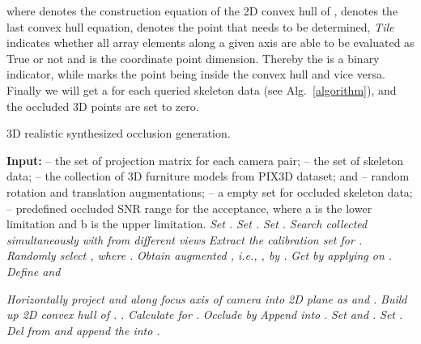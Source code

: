 \documentclass[lettersize,journal]{IEEEtran}
\begin{document}
where  denotes the construction equation of the 2D convex hull of ,  denotes the last convex hull equation,  denotes the point that needs to be determined, \textit{Tile} indicates whether all array elements along a given axis are able to be evaluated as True or not and  is the coordinate point dimension.
Thereby the  is a binary indicator, while  marks the point being inside the convex hull and vice versa. Finally we will get a  for each queried skeleton data (see Alg.~\ref{algorithm}), and the occluded 3D points are set to zero.
\begin{algorithm}[t]
    \caption{3D realistic synthesized occlusion generation.}
    \label{algorithm}
    \renewcommand{\thealgorithm}{}
    \begin{algorithmic}[1]
        \small{
            \STATEx \textbf{Input:}  -- the set of projection matrix for each camera pair;  -- the set of skeleton data;  -- the collection of 3D furniture models from PIX3D dataset;  and  -- random rotation and translation augmentations;  -- a empty set for occluded skeleton data;  -- predefined occluded SNR range for the acceptance, where a is the lower limitation and b is the upper limitation.
        }
        \FORALL{:}
        \STATE \textit{Set .}
        \WHILE{}
        \STATE \textit{Set .}
        \STATE \textit{Set .}
        \STATE {}
        \WHILE{}
        \STATE
        \textit{Search  collected simultaneously with  from different views}
        \STATE \textit{Extract the calibration set  for .}
        \STATE \textit{Randomly select , where .} 
        \STATE \textit{Obtain augmented , i.e., , by .} 
        \STATE \textit{Get  by applying  on .}
        \STATE \textit{Define  and }
            \STATE 
        \ENDIF
        \ENDWHILE

        \FOR{}
        \STATE \textit{Horizontally project  and  along focus axis of camera  into 2D plane as  and .}
        \STATE \textit{Build up 2D convex hull  of .}
        \State \textit{.}
        \State \textit{Calculate  for .}
        \State \textit{Occlude  by }
        \State \textit{Append  into }
        \STATE \textit{.}
        \ENDIF
        \ENDFOR
        \STATE \textit{Set  and .}
        \ELSE
        \STATE \textit{Set .}
        \STATE \textit{Del  from  and append the  into .}
        \ENDIF
        \ENDWHILE
        \ENDFOR
    \end{algorithmic}
\end{algorithm}
\end{document}
